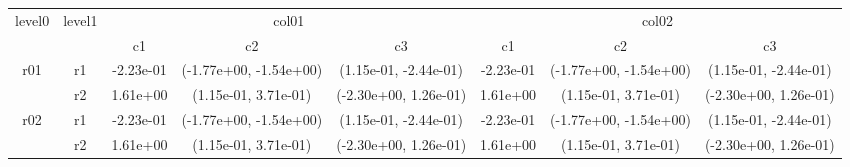 \begin{tabular}{cccccccc}
\toprule
\multirow{2}{*}{level0} & \multirow{2}{*}{level1}&\multicolumn{3}{c}{col01}&\multicolumn{3}{c}{col02}\tabularnewline
\cmidrule(lr){3-5}
\cmidrule(lr){6-8}
&&c1&c2&c3&c1&c2&c3\tabularnewline
\midrule
\midrule
\multirow{2}{*}{r01}&r1&-2.23e-01& (-1.77e+00, -1.54e+00)& (1.15e-01, -2.44e-01)&-2.23e-01& (-1.77e+00, -1.54e+00)& (1.15e-01, -2.44e-01)\tabularnewline
&r2&1.61e+00& (1.15e-01, 3.71e-01)& (-2.30e+00, 1.26e-01)&1.61e+00& (1.15e-01, 3.71e-01)& (-2.30e+00, 1.26e-01)\tabularnewline
\midrule
\multirow{2}{*}{r02}&r1&-2.23e-01& (-1.77e+00, -1.54e+00)& (1.15e-01, -2.44e-01)&-2.23e-01& (-1.77e+00, -1.54e+00)& (1.15e-01, -2.44e-01)\tabularnewline
&r2&1.61e+00& (1.15e-01, 3.71e-01)& (-2.30e+00, 1.26e-01)&1.61e+00& (1.15e-01, 3.71e-01)& (-2.30e+00, 1.26e-01)\tabularnewline
\bottomrule
\end{tabular}
